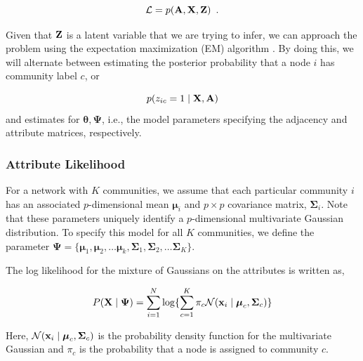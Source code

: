 \begin{equation}
\mathcal{L}=p({\bf A},{\bf X},{\bf Z})\enspace. 
\end{equation}

Given that ${\bf Z}$ is a latent variable that we are trying to infer, we can approach the problem using the expectation maximization (EM) algorithm \cite{dempster}. By doing this, we will alternate between estimating the posterior probability that a node $i$ has community label $c$, or

\begin{equation}
\label{post}
p(z_{ic}=1\mid {\bf X,A})
\end{equation} 
and estimates for ${\boldsymbol \theta, \boldsymbol \Psi}$, i.e., the model parameters specifying the adjacency and attribute matrices, respectively. 

\subsubsection{Attribute Likelihood}

For a network with $K$ communities, we assume that each particular community $i$ has an associated $p$-dimensional mean ${\boldsymbol \mu}_{i}$ and $p \times p$ covariance matrix, ${\boldsymbol \Sigma}_{i}$. Note that these parameters uniquely identify a $p$-dimensional multivariate Gaussian distribution. To specify this model for all $K$ communities, we define the parameter ${\boldsymbol \Psi}=\{{\boldsymbol \mu}_{1},{\boldsymbol \mu}_{2},\dots {\boldsymbol \mu}_{k},{\boldsymbol \Sigma}_{1},{\boldsymbol \Sigma}_{2},\dots {\boldsymbol \Sigma}_{K}\}$. 

The log likelihood for the mixture of Gaussians on the attributes is written as,

\begin{equation}
P({\bf X} \mid {\boldsymbol \Psi})=\sum_{i=1}^{N}\log\{\sum_{c=1}^{K}\pi_{c}\mathcal{N}({\bf x}_{i}\mid {\boldsymbol \mu}_{c},{\boldsymbol \Sigma}_{c})   \}
\end{equation}

%
Here, $\mathcal{N}({\bf x}_{i} \mid {\boldsymbol \mu}_{c},{\boldsymbol \Sigma}_{c})$ is the probability density function for the multivariate Gaussian and $\pi_{c}$ is the probability that a node is assigned to community $c$.

